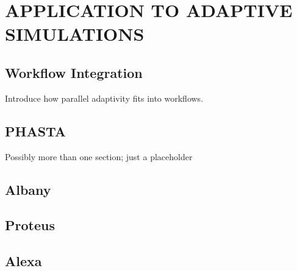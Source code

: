 
\chapter{APPLICATION TO ADAPTIVE SIMULATIONS}

\section{Workflow Integration}

Introduce how parallel adaptivity fits into workflows.

\section{PHASTA}

Possibly more than one section; just a placeholder

\section{Albany}

\section{Proteus}

\section{Alexa}

